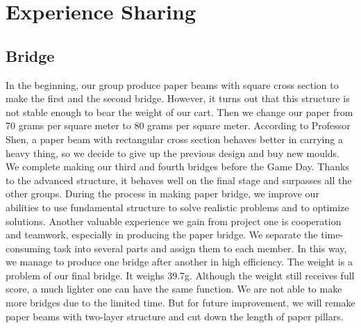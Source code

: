 \section{Experience Sharing}

\subsection{Bridge}
In the beginning, our group produce paper beams with square cross section to make the first and the second bridge. However, it turns out that this structure is not stable enough to bear the weight of our cart. Then we change our paper from 70 grams per square meter to 80 grams per square meter. According to Professor Shen, a paper beam with rectangular cross section behaves better in carrying a heavy thing, so we decide to give up the previous design and buy new moulds. We complete making our third and fourth bridges before the Game Day. Thanks to the advanced structure, it behaves well on the final stage and surpasses all the other groups.
During the process in making paper bridge, we improve our abilities to use fundamental structure to solve realistic problems and to optimize solutions. Another valuable experience we gain from project one is cooperation and teamwork, especially in producing the paper bridge. We separate the time-consuming task into several parts and assign them to each member. In this way, we manage to produce one bridge after another in high efficiency.
The weight is a problem of our final bridge. It weighs 39.7g. Although the weight still receives full score, a much lighter one can have the same function. We are not able to make more bridges due to the limited time. But for future improvement, we will remake paper beams with two-layer structure and cut down the length of paper pillars.

\newpage

